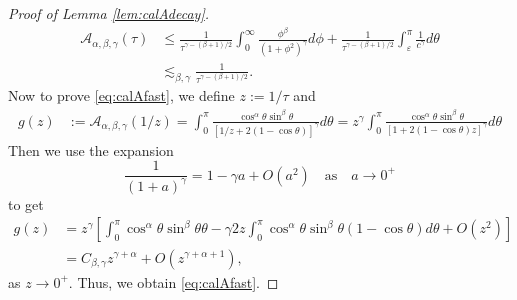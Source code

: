 \documentclass[11pt]{amsart}
\theoremstyle{definition}
\theoremstyle{remark}
\numberwithin{equation}{section}
\numberwithin{equation}{section}
\newcommand{\0}{\emptyset}
\newcommand{\ift}{\infty}
\newcommand{\alp}{\alpha}
\newcommand{\bt}{\beta}
\newcommand{\gmm}{\gamma}
\newcommand{\veps}{\varepsilon}
\newcommand{\tht}{\theta}
\newcommand{\calA}{\mathcal A}
\newcommand{\calF}{\mathcal F}
\begin{document}
\begin{proof}[Proof of Lemma \ref{lem:calAdecay}]
		\begin{equation}
			\begin{aligned}
				\calA_{\alp,\bt,\gmm}(\tau)&\leq\frac{1}{\tau^{\gmm-(\bt+1)/2}}\int_{0}^{\ift}\frac{\phi^{\bt}}{(1+\phi^{2})^{\gmm}}d\phi+\frac{1}{\tau^{\gmm-(\bt+1)/2}}\int_{\veps}^{\pi}\frac{1}{c^{\gmm}}d\tht\\
				&\lesssim_{\bt,\gmm}\frac{1}{\tau^{\gmm-(\bt+1)/2}}.
			\end{aligned}
		\end{equation}
		Now to prove \eqref{eq:calAfast}, we define $z:=1/\tau$ and %
		\begin{equation}
			\begin{aligned}
				g(z)&:=\calA_{\alp,\bt,\gmm}(1/z)=\int_{0}^{\pi}\frac{\cos^{\alp}\tht\sin^{\bt}\tht}{[1/z+2(1-\cos\tht)]^{\gmm}}d\tht=z^{\gmm}\int_{0}^{\pi}\frac{\cos^{\alp}\tht\sin^{\bt}\tht}{[1+2(1-\cos\tht)z]^{\gmm}}d\tht
			\end{aligned}
		\end{equation}
		Then we use the expansion
		\begin{equation}
			\frac{1}{(1+a)^{\gmm}}=1-\gmm a+O(a^{2})\quad\text{as}\quad a\to 0^{+}
		\end{equation}
		to get
		\begin{equation}
			\begin{aligned}
				g(z)&=z^{\gmm}\left[ \int_{0}^{\pi}\cos^{\alp}\tht\sin^{\bt}\tht\tht-\gmm 2z\int_{0}^{\pi}\cos^{\alp}\tht\sin^{\bt}\tht(1-\cos\tht)d\tht+O(z^{2})\right]\\
				&=C_{\bt,\gmm}z^{\gmm+\alp}+O(z^{\gmm+\alp+1}),
			\end{aligned}
		\end{equation}
		as $z\to0^{+}$. Thus, we obtain \eqref{eq:calAfast}.
	\end{proof}
	
	

	
\end{document}
